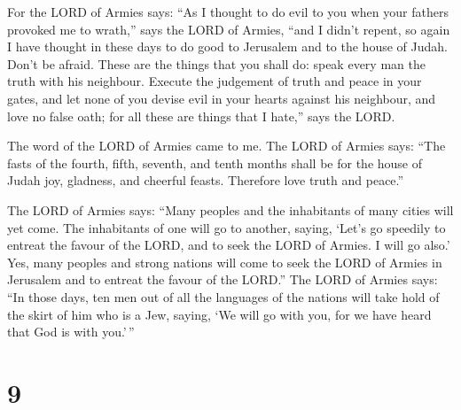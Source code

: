  For the LORD of Armies says: ``As I thought to do evil
to you when your fathers provoked me to wrath,'' says the LORD of
Armies, ``and I didn't repent,  so again I have thought
in these days to do good to Jerusalem and to the house of Judah. Don't
be afraid.  These are the things that you shall do: speak
every man the truth with his neighbour. Execute the judgement of truth
and peace in your gates,  and let none of you devise evil
in your hearts against his neighbour, and love no false oath; for all
these are things that I hate,'' says the LORD.

 The word of the LORD of Armies came to me.
 The LORD of Armies says: ``The fasts of the fourth,
fifth, seventh, and tenth months shall be for the house of Judah joy,
gladness, and cheerful feasts. Therefore love truth and peace.''

 The LORD of Armies says: ``Many peoples and the
inhabitants of many cities will yet come.  The
inhabitants of one will go to another, saying, `Let's go speedily to
entreat the favour of the LORD, and to seek the LORD of Armies. I will
go also.'  Yes, many peoples and strong nations will come
to seek the LORD of Armies in Jerusalem and to entreat the favour of the
LORD.''  The LORD of Armies says: ``In those days, ten
men out of all the languages of the nations will take hold of the skirt
of him who is a Jew, saying, `We will go with you, for we have heard
that God is with you.'\,''

\hypertarget{section-8}{%
\section{9}\label{section-8}}

